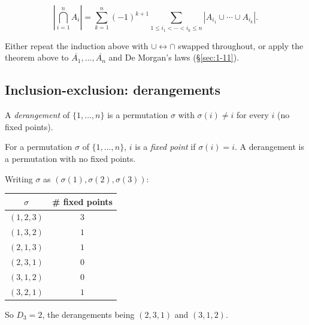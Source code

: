 \begin{corollary}
\[
\left|\bigcap_{i=1}^n A_i\right| = \sum_{k=1}^n (-1)^{k+1} \sum_{1\le i_1<\cdots<i_k\le n} |A_{i_1}\cup\cdots\cup A_{i_k}|.
\]
\end{corollary}
\begin{note}
Either repeat the induction above with $\cup\leftrightarrow\cap$ swapped throughout, or apply the theorem above to $\overline{A_1},\dots,\overline{A_n}$ and De Morgan's laws (\S\ref{sec:1-11}).
\end{note}

\subsection{Inclusion-exclusion: derangements}
\label{sec:8-4}

\begin{definition}[Derangement]
A \emph{derangement} of $\{1,\dots,n\}$ is a permutation $\sigma$ with $\sigma(i)\neq i$ for every $i$ (no fixed points).
\end{definition}

\begin{definition}
For a permutation $\sigma$ of $\{1,\dots,n\}$, $i$ is a \emph{fixed point} if $\sigma(i)=i$. A derangement is a permutation with no fixed points.
\end{definition}

\begin{example}[Permutations of $\{1,2,3\}$]
Writing $\sigma$ as $(\sigma(1),\sigma(2),\sigma(3))$:
\begin{center}
\begin{tabular}{c|c}
$\sigma$ & \# fixed points \\ \hline
$(1,2,3)$ & $3$ \\
$(1,3,2)$ & $1$ \\
$(2,1,3)$ & $1$ \\
$(2,3,1)$ & $0$ \\
$(3,1,2)$ & $0$ \\
$(3,2,1)$ & $1$
\end{tabular}
\end{center}
So $D_3=2$, the derangements being $(2,3,1)$ and $(3,1,2)$.
\end{example}

